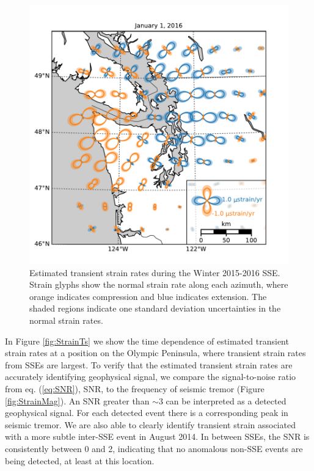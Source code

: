 \documentclass[10pt,letter]{article}
\begin{document}
\begin{figure}
\includegraphics{figures/strain_map/strain-map.pdf}
\caption{Estimated transient strain rates during the Winter 2015-2016 SSE. Strain glyphs show the normal strain rate along each azimuth, where orange indicates compression and blue indicates extension. The shaded regions indicate one standard deviation uncertainties in the normal strain rates.}   
\label{fig:StrainMap}
\end{figure}

In Figure \ref{fig:StrainTs} we show the time dependence of estimated transient strain rates at a position on the Olympic Peninsula, where transient strain rates from SSEs are largest. To verify that the estimated transient strain rates are accurately identifying geophysical signal, we compare the signal-to-noise ratio from eq. (\ref{eq:SNR}), SNR, to the frequency of seismic tremor (Figure \ref{fig:StrainMag}). An SNR greater than ${\sim}3$ can be interpreted as a detected geophysical signal. For each detected event there is a corresponding peak in seismic tremor. We are also able to clearly identify transient strain associated with a more subtle inter-SSE event in August 2014. In between SSEs, the SNR is consistently between 0 and 2, indicating that no anomalous non-SSE events are being detected, at least at this location. 
\end{document}
